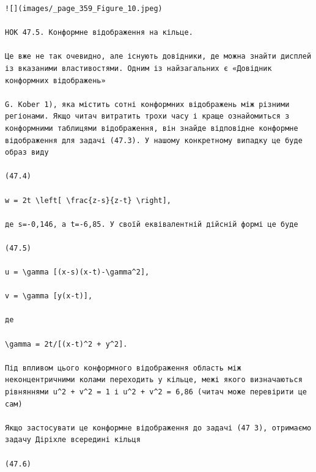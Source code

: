\documentclass[
  ukrainian,
]{article}
\begin{document}
\begin{verbatim}
![](images/_page_359_Figure_10.jpeg)

НОК 47.5. Конформне відображення на кільце.

Це вже не так очевидно, але існують довідники, де можна знайти дисплей із вказаними властивостями. Одним із найзагальних є «Довідник конформних відображень»

G. Kober 1), яка містить сотні конформних відображень між різними регіонами. Якщо читач витратить трохи часу і краще ознайомиться з конформними таблицями відображення, він знайде відповідне конформне відображення для задачі (47.3). У нашому конкретному випадку це буде образ виду

(47.4)

w = 2t \left[ \frac{z-s}{z-t} \right],

де s=-0,146, а t=-6,85. У своїй еквівалентній дійсній формі це буде

(47.5)

u = \gamma [(x-s)(x-t)-\gamma^2],

v = \gamma [y(x-t)],

де

\gamma = 2t/[(x-t)^2 + y^2].

Під впливом цього конформного відображення область між неконцентричними колами переходить у кільце, межі якого визначаються рівняннями u^2 + v^2 = 1 і u^2 + v^2 = 6,86 (читач може перевірити це сам)

Якщо застосувати це конформне відображення до задачі (47 3), отримаємо задачу Діріхле всередині кільця

(47.6)


\end{verbatim}
\end{document}

